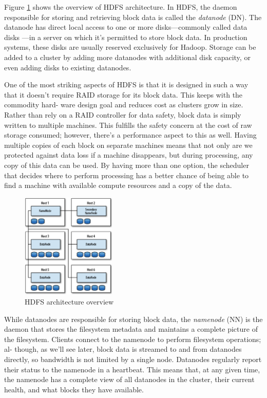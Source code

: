 \documentclass[twocolumn]{article}
\begin{document}
Figure \ref{HDFSOverview} shows the overview of HDFS architecture.
In HDFS, the daemon responsible for storing and retrieving block data is called the \emph{datanode} (DN). The datanode has direct local access to one or more disks—commonly called data disks —in a server on which it’s permitted to store block data. In production systems, these disks are usually reserved exclusively for Hadoop. Storage can be added to a cluster by adding more datanodes with additional disk capacity, or even adding disks to existing datanodes.

One of the most striking aspects of HDFS is that it is designed in such a way that it doesn’t require RAID storage for its block data. This keeps with the commodity hard- ware design goal and reduces cost as clusters grow in size. Rather than rely on a RAID controller for data safety, block data is simply written to multiple machines. This fulfills the safety concern at the cost of raw storage consumed; however, there’s a performance aspect to this as well. Having multiple copies of each block on separate machines means that not only are we protected against data loss if a machine disappears, but during processing, any copy of this data can be used. By having more than one option, the scheduler that decides where to perform processing has a better chance of being able
to find a machine with available compute resources and a copy of the data.
\begin{figure}[htb]
	\centering
	\includegraphics[width=0.4\textwidth]{HDFSOverview}
	\caption{HDFS architecture overview}
	\label{HDFSOverview}
\end{figure}

While datanodes are responsible for storing block data, the \emph{namenode} (NN) is the daemon that stores the filesystem metadata and maintains a complete picture of the filesystem. Clients connect to the namenode to perform filesystem operations; al- though, as we’ll see later, block data is streamed to and from datanodes directly, so bandwidth is not limited by a single node. Datanodes regularly report their status to the namenode in a heartbeat. This means that, at any given time, the namenode has a complete view of all datanodes in the cluster, their current health, and what blocks they have available. 
\end{document}
